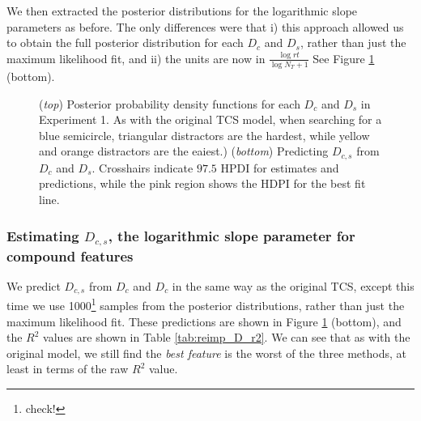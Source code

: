 \documentclass[smallextended, natbib]{svjour3}       %
\begin{document}
We then extracted the posterior distributions for the logarithmic slope parameters as before. The only differences were that i) this approach allowed us to obtain the full posterior distribution for each $D_c$ and $D_s$, rather than just the maximum likelihood fit, and ii) the units are now in $\frac{\log{rt}}{\log{N_T+1}}$ See Figure \ref{fig:buetti2019_D} (bottom).

\begin{figure}
\centering
{}
\caption{(\textit{top}) Posterior probability density functions for each $D_c$ and $D_s$ in Experiment 1. As with the original TCS model, when searching for a blue semicircle, triangular distractors are the hardest, while yellow and orange distractors are the eaiest.) (\textit{bottom}) Predicting $D_{c,s}$ from $D_c$ and $D_s$. Crosshairs indicate $97.5$ HPDI for estimates and predictions, while the pink region shows the HDPI for the best fit line. }
\label{fig:buetti2019_D}
\end{figure}

\subsubsection{Estimating $D_{c,s}$, the logarithmic slope parameter for compound features}

We predict $D_{c,s}$ from $D_c$ and $D_c$ in the same way as the original TCS, except this time we use 1000\footnote{check!} samples from the posterior distributions, rather than just the maximum likelihood fit. These predictions are shown in Figure \ref{fig:buetti2019_D} (bottom), and the $R^2$ values are shown in Table \ref{tab:reimp_D_r2}. We can see that as with the original model, we still find the \textit{best feature} is the worst of the three methods, at least in terms of the raw $R^2$ value.
\end{document}
